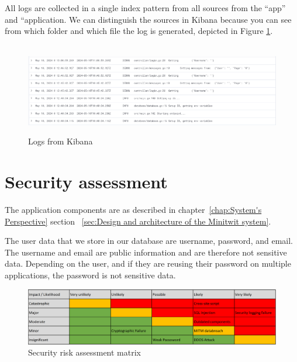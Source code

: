 \documentclass[12pt, a4paper, oneside]{book}
\begin{document}
All logs are collected in a single index pattern from all sources from the “app” and “application.
We can distinguish the sources in Kibana because you can see from which folder and which file the log is generated, depicted in Figure \ref{fig:kabana-logs}.
\begin{figure}[H]
    \centering
    \hbox{\hspace{-5em}
    \includegraphics[scale = 0.6]{images/kibana.png}}
    \caption{Logs from Kibana}
    \label{fig:kabana-logs}
\end{figure}

\section{Security assessment}
The application components are as described in chapter~\ref{chap:System's Perspective} section 
~\ref{sec:Design and architecture of the Minitwit system}. 

The user data that we store in our database are username, password, and email.
The username and email are public information and are therefore not sensitive data.
Depending on the user, and if they are reusing their password on multiple applications, the password is not sensitive data.

\begin{figure}[H]
    \centering
    \includegraphics[width=1.0\textwidth]{images/SecRiskAssMatrix.PNG}
    \caption{Security risk assessment matrix\cite{owasp2024}\cite{comparitech2024}}
    \label{fig:security matrix}
\end{figure}
\end{document}

